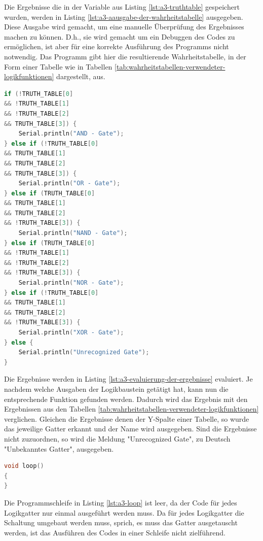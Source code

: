 Die Ergebnisse die in der Variable aus Listing \ref{lst:a3-truthtable} gespeichert wurden, werden in Listing \ref{lst:a3-aausgabe-der-wahrheitstabelle} ausgegeben.
Diese Ausgabe wird gemacht, um eine manuelle Überprüfung des Ergebnisses machen zu können.
D.h., sie wird gemacht um ein Debuggen des Codes zu ermöglichen, ist aber für eine korrekte Ausführung des Programms nicht notwendig.
Das Programm gibt hier die resultierende Wahrheitstabelle, in der Form einer Tabelle wie in Tabellen \ref{tab:wahrheitstabellen-verwendeter-logikfunktionen} dargestellt, aus.

\newpage

\begin{lstlisting}[language=C,label={lst:a3-evaluierung-der-ergebnisse}, caption={Evaluierung der Ergebnisse}]
if (!TRUTH_TABLE[0]
&& !TRUTH_TABLE[1]
&& !TRUTH_TABLE[2]
&& TRUTH_TABLE[3]) {
    Serial.println("AND - Gate");
} else if (!TRUTH_TABLE[0]
&& TRUTH_TABLE[1]
&& TRUTH_TABLE[2]
&& TRUTH_TABLE[3]) {
    Serial.println("OR - Gate");
} else if (TRUTH_TABLE[0]
&& TRUTH_TABLE[1]
&& TRUTH_TABLE[2]
&& !TRUTH_TABLE[3]) {
    Serial.println("NAND - Gate");
} else if (TRUTH_TABLE[0]
&& !TRUTH_TABLE[1]
&& !TRUTH_TABLE[2]
&& !TRUTH_TABLE[3]) {
    Serial.println("NOR - Gate");
} else if (!TRUTH_TABLE[0]
&& TRUTH_TABLE[1]
&& TRUTH_TABLE[2]
&& !TRUTH_TABLE[3]) {
    Serial.println("XOR - Gate");
} else {
    Serial.println("Unrecognized Gate");
}
\end{lstlisting}

Die Ergebnisse werden in Listing \ref{lst:a3-evaluierung-der-ergebnisse} evaluiert.
Je nachdem welche Ausgaben der Logikbaustein getätigt hat, kann nun die entsprechende Funktion gefunden werden.
Dadurch wird das Ergebnis mit den Ergebnissen aus den Tabellen \ref{tab:wahrheitstabellen-verwendeter-logikfunktionen} verglichen.
Gleichen die Ergebnisse denen der Y-Spalte einer Tabelle, so wurde das jeweilige Gatter erkannt und der Name wird ausgegeben.
Sind die Ergebnisse nicht zuzuordnen, so wird die Meldung "Unrecognized Gate", zu Deutsch "Unbekanntes Gatter", ausgegeben.

\begin{lstlisting}[language=C,label={lst:a3-loop}, caption={Programmschleife}]
void loop()
{
}
\end{lstlisting}

\newpage

Die Programmschleife in Listing \ref{lst:a3-loop} ist leer, da der Code für jedes Logikgatter nur einmal ausgeführt werden muss.
Da für jedes Logikgatter die Schaltung umgebaut werden muss, sprich, es muss das Gatter ausgetauscht werden, ist das Ausführen  des Codes in einer Schleife nicht zielführend.

